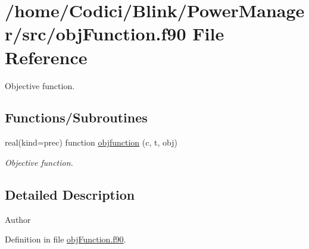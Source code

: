 \hypertarget{obj_function_8f90}{\section{/home/\-Codici/\-Blink/\-Power\-Manager/src/obj\-Function.f90 File Reference}
\label{obj_function_8f90}
}


Objective function.  


\subsection*{Functions/\-Subroutines}
\begin{DoxyCompactItemize}
\item 
real(kind=prec) function \hyperlink{obj_function_8f90_a8586ea0db25d91bd8ca4ce412f7a397c}{objfunction} (c, t, obj)
\begin{DoxyCompactList}\small\item\em Objective function. \end{DoxyCompactList}\end{DoxyCompactItemize}


\subsection{Detailed Description}
\begin{DoxyAuthor}{Author}

\end{DoxyAuthor}


Definition in file \hyperlink{obj_function_8f90_source}{obj\-Function.\-f90}.



